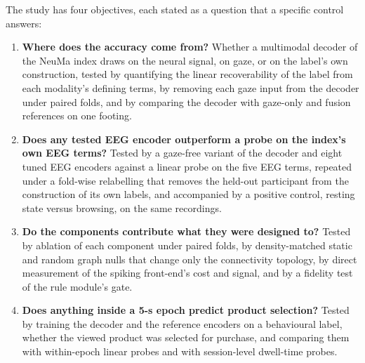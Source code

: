 The study has four objectives, each stated as a question that a specific control answers:
\begin{enumerate}
\item[RQ1] \textbf{Where does the accuracy come from?} Whether a multimodal decoder of the NeuMa index draws on the neural signal, on gaze, or on the label's own construction, tested by quantifying the linear recoverability of the label from each modality's defining terms, by removing each gaze input from the decoder under paired folds, and by comparing the decoder with gaze-only and fusion references on one footing.
\item[RQ2] \textbf{Does any tested EEG encoder outperform a probe on the index's own EEG terms?} Tested by a gaze-free variant of the decoder and eight tuned EEG encoders against a linear probe on the five EEG terms, repeated under a fold-wise relabelling that removes the held-out participant from the construction of its own labels, and accompanied by a positive control, resting state versus browsing, on the same recordings.
\item[RQ3] \textbf{Do the components contribute what they were designed to?} Tested by ablation of each component under paired folds, by density-matched static and random graph nulls that change only the connectivity topology, by direct measurement of the spiking front-end's cost and signal, and by a fidelity test of the rule module's gate.
\item[RQ4] \textbf{Does anything inside a 5-s epoch predict product selection?} Tested by training the decoder and the reference encoders on a behavioural label, whether the viewed product was selected for purchase, and comparing them with within-epoch linear probes and with session-level dwell-time probes.
\end{enumerate}

